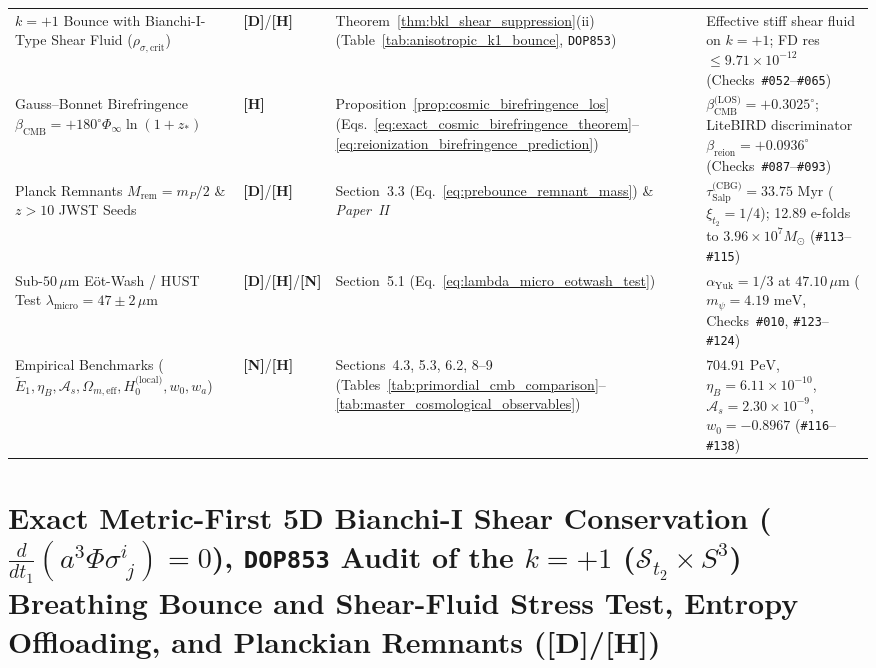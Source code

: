 \documentclass[11pt,a4paper]{article}
\newcommand{\catD}{\textbf{\textcolor{blue!75!black}{[D]}}}
\newcommand{\catH}{\textbf{\textcolor{orange!85!black}{[H]}}}
\newcommand{\catN}{\textbf{\textcolor{teal!75!black}{[N]}}}
\theoremstyle{plain}
\theoremstyle{definition}
\theoremstyle{remark}
\numberwithin{equation}{section}
\begin{document}
\begin{table}[H]
\begin{tabularx}{\textwidth}{@{} L{0.27\textwidth} C{0.12\textwidth} L{0.21\textwidth} Y @{}}
    $k=+1$ Bounce with Bianchi-I-Type Shear Fluid ($\rho_{\sigma,\text{crit}}$) & \catD/\catH & Theorem~\ref{thm:bkl_shear_suppression}(ii) (Table~\ref{tab:anisotropic_k1_bounce}, \texttt{DOP853}) & Effective stiff shear fluid on $k=+1$; FD res $\le 9.71\times 10^{-12}$ (Checks~\texttt{\#052}--\texttt{\#065}) \\
    Gauss--Bonnet Birefringence $\beta_{\text{CMB}} = +180^\circ\Phi_{\infty}\ln(1+z_*)$ & \catH & Proposition~\ref{prop:cosmic_birefringence_los} (Eqs.~\ref{eq:exact_cosmic_birefringence_theorem}--\ref{eq:reionization_birefringence_prediction}) & $\beta_{\text{CMB}}^{\text{(LOS)}} = +0.3025^\circ$; LiteBIRD discriminator $\beta_{\text{reion}} = +0.0936^\circ$ (Checks~\texttt{\#087}--\texttt{\#093}) \\
    Planck Remnants $M_{\text{rem}} = m_P/2$ \& $z > 10$ JWST Seeds & \catD/\catH & Section~3.3 (Eq.~\ref{eq:prebounce_remnant_mass}) \& \textit{Paper~II} \cite{jimenez2026b} & $\tau_{\text{Salp}}^{\text{(CBG)}} = 33.75\text{ Myr}$ ($\xi_{t_2}=1/4$); 12.89 e-folds to $3.96\times 10^7 M_{\odot}$ (\texttt{\#113}--\texttt{\#115}) \\
    Sub-$50\,\mu\text{m}$ E\"ot-Wash / HUST Test $\lambda_{\text{micro}} = 47 \pm 2\,\mu\text{m}$ & \catD/\catH/\catN & Section~5.1 (Eq.~\ref{eq:lambda_micro_eotwash_test}) & $\alpha_{\text{Yuk}} = 1/3$ at $47.10\,\mu\text{m}$ ($m_{\psi} = 4.19\text{ meV}$, Checks~\texttt{\#010}, \texttt{\#123}--\texttt{\#124}) \cite{lee2020,tan2020_hust} \\
    Empirical Benchmarks ($\widetilde{E}_1, \eta_B, \mathcal{A}_s,\allowbreak \Omega_{m,\text{eff}},\allowbreak H_0^{\text{(local)}},\allowbreak w_0, w_a$) & \catN/\catH & Sections~4.3, 5.3, 6.2, 8--9 (Tables~\ref{tab:primordial_cmb_comparison}--\ref{tab:master_cosmological_observables}) & $704.91\text{ PeV}$, $\eta_B = 6.11\times 10^{-10}$, $\mathcal{A}_s = 2.30\times 10^{-9}$, $w_0=-0.8967$ (\texttt{\#116}--\texttt{\#138}) \\
    \bottomrule
  \end{tabularx}
\end{table}

\section{\texorpdfstring{Exact Metric-First 5D Bianchi-I Shear Conservation ($\frac{d}{dt_1}(a^3\Phi\sigma^i_{\;j}) = 0$), \texttt{DOP853} Audit of the $k = +1$ ($\mathcal{S}_{t_2} \times S^3$) Breathing Bounce and Shear-Fluid Stress Test, Entropy Offloading, and Planckian Remnants (\catD/\catH)}{Exact Metric-First 5D Bianchi-I Shear Conservation, DOP853 Audit of the k = +1 Breathing Bounce and Shear-Fluid Stress Test, Entropy Offloading, and Planckian Remnants}}
\end{document}
